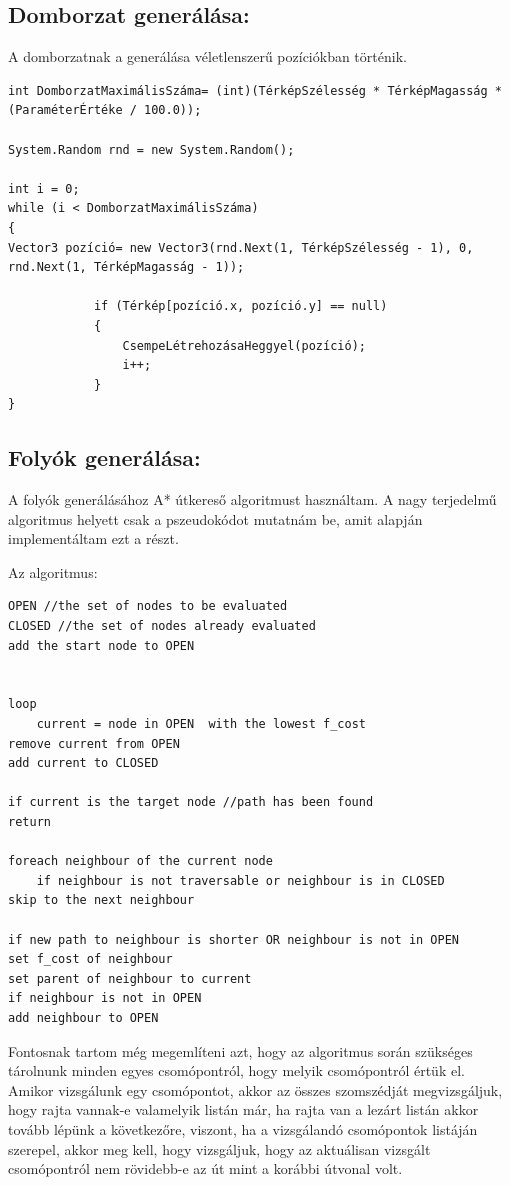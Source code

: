 \subsection{Domborzat generálása:}

A domborzatnak a generálása véletlenszerű pozíciókban történik.

\begin{verbatim}
int DomborzatMaximálisSzáma= (int)(TérképSzélesség * TérképMagasság * (ParaméterÉrtéke / 100.0));

System.Random rnd = new System.Random();

int i = 0;
while (i < DomborzatMaximálisSzáma)
{
Vector3 pozíció= new Vector3(rnd.Next(1, TérképSzélesség - 1), 0, rnd.Next(1, TérképMagasság - 1));

            if (Térkép[pozíció.x, pozíció.y] == null)
            {
                CsempeLétrehozásaHeggyel(pozíció);
                i++;
            }
}
\end{verbatim}

\subsection{Folyók generálása:}

A folyók generálásához A* útkereső algoritmust használtam. A nagy terjedelmű algoritmus helyett csak a pszeudokódot mutatnám be, amit alapján implementáltam ezt a részt.

Az algoritmus:

\begin{verbatim}
OPEN //the set of nodes to be evaluated
CLOSED //the set of nodes already evaluated
add the start node to OPEN


loop
	current = node in OPEN  with the lowest f_cost
remove current from OPEN
add current to CLOSED

if current is the target node //path has been found
return

foreach neighbour of the current node
	if neighbour is not traversable or neighbour is in CLOSED
skip to the next neighbour

if new path to neighbour is shorter OR neighbour is not in OPEN
set f_cost of neighbour
set parent of neighbour to current
if neighbour is not in OPEN
add neighbour to OPEN
\end{verbatim}

Fontosnak tartom még megemlíteni azt, hogy az algoritmus során szükséges tárolnunk minden egyes csomópontról, hogy melyik csomópontról értük el. Amikor vizsgálunk egy csomópontot, akkor az összes szomszédját megvizsgáljuk, hogy rajta vannak-e valamelyik listán már, ha rajta van a lezárt listán akkor tovább lépünk a következőre, viszont, ha a vizsgálandó csomópontok listáján szerepel, akkor meg kell, hogy vizsgáljuk, hogy az aktuálisan vizsgált csomópontról nem rövidebb-e az út mint a korábbi útvonal volt.

